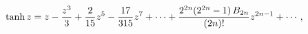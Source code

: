 \[\mathop{\tanh\/}\nolimits z=z-\frac{z^{3}}{3}+\frac{2}{15}z^{5}-\frac{17}{315}%
z^{7}+\cdots+\frac{2^{2n}(2^{2n}-1)\mathop{B_{2n}\/}\nolimits}{(2n)!}z^{2n-1}+\cdots,\]